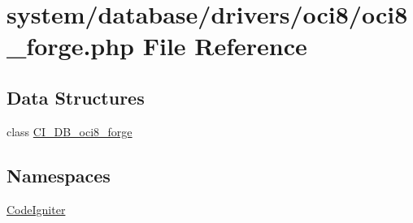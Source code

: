 \hypertarget{oci8__forge_8php}{\section{system/database/drivers/oci8/oci8\-\_\-forge.php File Reference}
\label{oci8__forge_8php}
}
\subsection*{Data Structures}
\begin{DoxyCompactItemize}
\item 
class \hyperlink{class_c_i___d_b__oci8__forge}{C\-I\-\_\-\-D\-B\-\_\-oci8\-\_\-forge}
\end{DoxyCompactItemize}
\subsection*{Namespaces}
\begin{DoxyCompactItemize}
\item 
\hyperlink{namespace_code_igniter}{Code\-Igniter}
\end{DoxyCompactItemize}
